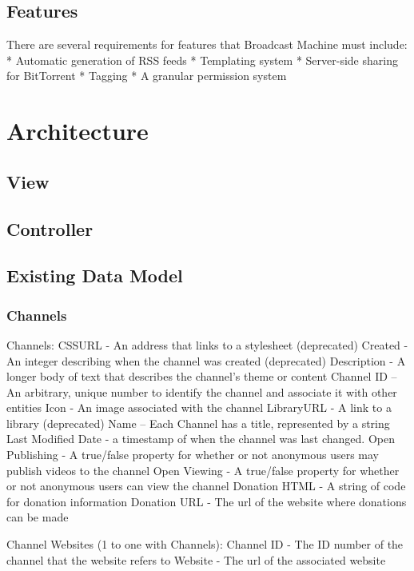 \documentclass[a4paper,12pt]{report}
\begin{document}
\section{Features}
There are several requirements for features that Broadcast Machine must include:
 * Automatic generation of RSS feeds
 * Templating system
 * Server-side sharing for BitTorrent
 * Tagging
 * A granular permission system

\chapter{Architecture}

\section{View}

\section{Controller}

\section{Existing Data Model}

\subsection{Channels}
Channels:
    CSSURL - An address that links to a stylesheet (deprecated)
    Created - An integer describing when the channel was created (deprecated)
    Description - A longer body of text that describes the channel's theme or content
    Channel ID – An arbitrary, unique number to identify the channel and  associate it with other entities
    Icon - An image associated with the channel
    LibraryURL - A link to a library (deprecated)
    Name – Each Channel has a title, represented by a string
    Last Modified Date - a timestamp of when the channel was last changed.
    Open Publishing - A true/false property for whether or not anonymous users may publish videos to the channel
    Open Viewing - A true/false property for whether or not anonymous users can view the channel
    Donation HTML - A string of code for donation information
    Donation URL - The url of the website where donations can be made

Channel Websites (1 to one with Channels):
    Channel ID - The ID number of the channel that the website refers to
    Website - The url of the associated website
\end{document}
